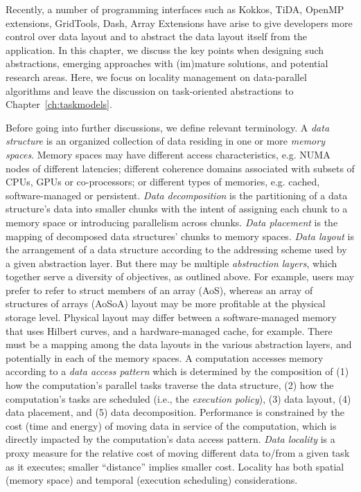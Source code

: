 Recently, a number of programming interfaces such as Kokkos, TiDA, OpenMP
extensions, GridTools, Dash, Array Extensions \cite{all} have arise to give developers more control over 
 data layout and to abstract the data layout itself from the application. 
 In this chapter, we discuss the key points when designing such abstractions, emerging approaches with (im)mature
 solutions, and potential research areas. Here, we focus on  locality management on data-parallel algorithms 
 and leave the discussion on task-oriented abstractions to Chapter~\ref{ch:taskmodels}.



Before going into further discussions, we define relevant terminology. 
%
%
A {\em data structure} is an organized collection of data residing in one or more {\em memory spaces}.
%
Memory spaces may have different access characteristics, e.g. NUMA nodes of different latencies; different coherence domains associated with subsets of CPUs, GPUs or co-processors; or different types of memories, e.g. cached, software-managed or persistent.
%
{\em Data decomposition} is the partitioning of a data structure's data into smaller chunks with the intent of assigning each chunk to a memory space or introducing parallelism across chunks. 
%
{\em Data placement} is the mapping of decomposed data structures' chunks to memory spaces.
%
%
%
{\em Data layout} is the arrangement of a data structure according to the addressing scheme used by a given abstraction layer.  But there may be multiple {\em abstraction layers}, which together serve a diversity of objectives, as outlined above.  For example, users may prefer to refer to struct members of an array (AoS), whereas an array of structures of arrays (AoSoA) layout may be more profitable at the physical storage level.  Physical layout may differ between a software-managed memory that uses Hilbert curves, and a hardware-managed cache, for example.  There must be a mapping among the data layouts in the various abstraction layers, and potentially in each of the memory spaces.
%
A computation accesses memory according to a {\em data access pattern} which is determined by the composition of (1) how the computation's parallel tasks traverse the data structure,
(2) how the computation's tasks are scheduled (i.e., the {\em execution policy}), 
(3) data layout,
(4) data placement, and
(5) data decomposition.
%
Performance is constrained by the cost (time and energy) of moving data in service of the computation, which is directly impacted by the computation's data access pattern.
%
{\em Data locality} is a proxy measure for the relative cost of moving different data to/from a given task as it executes; smaller ``distance'' implies smaller cost.
%
Locality has both spatial (memory space) and temporal (execution scheduling) considerations.


